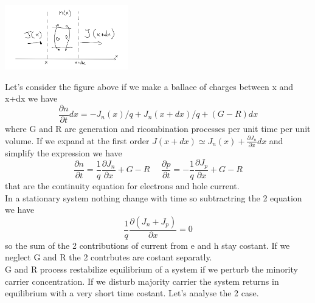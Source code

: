 \centering
\includegraphics[width=0.4\textwidth]{continuityeq.png}\\
\raggedright

Let's consider the figure above if we make a ballace of charges between x and x+dx we have 
\begin{equation}
\frac{\partial n}{\partial t}dx=-J_n(x)/q+J_n(x+dx)/q+(G-R)dx
\end{equation}
where G and R are generation and ricombination processes per unit time per unit volume. If we expand at the first order $J(x+dx)\simeq J_n(x)+\frac{\partial J_n}{\partial x}dx $ and simplify the expression we have
\begin{equation}
\frac{\partial n}{\partial t}=\frac{1}{q}\frac{\partial J_n}{\partial x}+G-R \ \ \ \ \ \ \frac{\partial p}{\partial t}=-\frac{1}{q}\frac{\partial J_p}{\partial x}+G-R
\end{equation}
that are the continuity equation for electrons and hole current.\\
In a stationary system nothing change with time so subtractring the 2 equation we have 
\begin{equation}
\frac{1}{q}\frac{\partial(J_n+J_p)}{\partial x}=0
\end{equation}
so the sum of the 2 contributions of current from e and h stay costant. If we neglect G and R the 2 contrbutes are costant separatly.\\
G and R process restabilize equilibrium of a system if we perturb the minority carrier concentration. If we disturb majority carrier the system returns in equilibrium with a very short time costant.
Let's analyse the 2 case.\\ 

